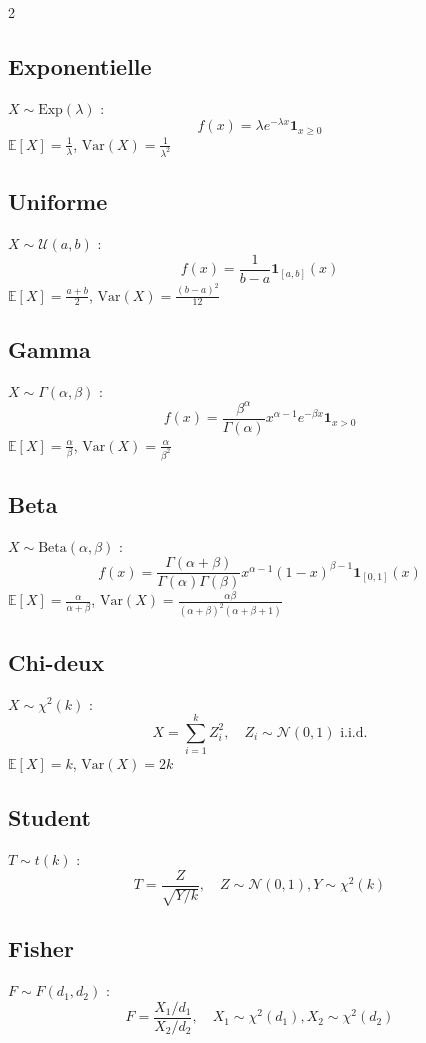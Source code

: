 \documentclass[10pt,a4paper]{article}
\begin{document}
\begin{multicols}{2}
\subsection*{Exponentielle}
$X \sim \text{Exp}(\lambda)$ :
\[
f(x) = \lambda e^{-\lambda x} \mathbf{1}_{x \geq 0}
\]
$\mathbb{E}[X] = \frac{1}{\lambda}$, $\text{Var}(X) = \frac{1}{\lambda^2}$

\subsection*{Uniforme}
$X \sim \mathcal{U}(a, b)$ :
\[
f(x) = \frac{1}{b-a} \mathbf{1}_{[a,b]}(x)
\]
$\mathbb{E}[X] = \frac{a+b}{2}$, $\text{Var}(X) = \frac{(b-a)^2}{12}$

\subsection*{Gamma}
$X \sim \Gamma(\alpha, \beta)$ :
\[
f(x) = \frac{\beta^\alpha}{\Gamma(\alpha)} x^{\alpha-1} e^{-\beta x} \mathbf{1}_{x > 0}
\]
$\mathbb{E}[X] = \frac{\alpha}{\beta}$, $\text{Var}(X) = \frac{\alpha}{\beta^2}$

\subsection*{Beta}
$X \sim \text{Beta}(\alpha, \beta)$ :
\[
f(x) = \frac{\Gamma(\alpha+\beta)}{\Gamma(\alpha)\Gamma(\beta)} x^{\alpha-1} (1-x)^{\beta-1} \mathbf{1}_{[0,1]}(x)
\]
$\mathbb{E}[X] = \frac{\alpha}{\alpha+\beta}$, $\text{Var}(X) = \frac{\alpha\beta}{(\alpha+\beta)^2(\alpha+\beta+1)}$

\subsection*{Chi-deux}
$X \sim \chi^2(k)$ :
\[
X = \sum_{i=1}^k Z_i^2, \quad Z_i \sim \mathcal{N}(0,1) \text{ i.i.d.}
\]
$\mathbb{E}[X] = k$, $\text{Var}(X) = 2k$

\subsection*{Student}
$T \sim t(k)$ :
\[
T = \frac{Z}{\sqrt{Y/k}}, \quad Z \sim \mathcal{N}(0,1), Y \sim \chi^2(k)
\]

\subsection*{Fisher}
$F \sim F(d_1, d_2)$ :
\[
F = \frac{X_1/d_1}{X_2/d_2}, \quad X_1 \sim \chi^2(d_1), X_2 \sim \chi^2(d_2)
\]

\end{multicols}
\end{document}
